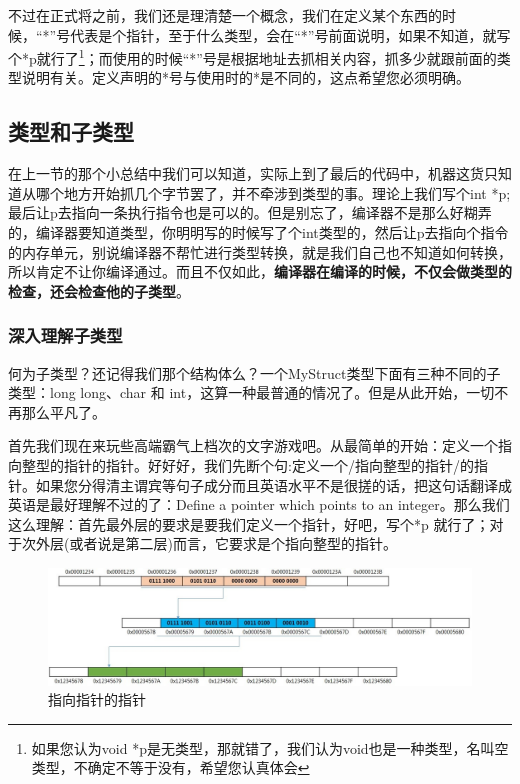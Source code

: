 \documentclass[11pt,twoside,a4paper,titlepage]{article}	%
\begin{document}
不过在正式将之前，我们还是理清楚一个概念，我们在定义某个东西的时候，“*”号代表是个指针，至于什么类型，会在“*”号前面说明，如果不知道，就写个*p就行了\footnote{如果您认为void *p是无类型，那就错了，我们认为void也是一种类型，名叫空类型，不确定不等于没有，希望您认真体会}；而使用的时候“*”号是根据地址去抓相关内容，抓多少就跟前面的类型说明有关。定义声明的*号与使用时的*是不同的，这点希望您必须明确。

\subsection{类型和子类型}
在上一节的那个小总结中我们可以知道，实际上到了最后的代码中，机器这货只知道从哪个地方开始抓几个字节罢了，并不牵涉到类型的事。理论上我们写个int *p;最后让p去指向一条执行指令也是可以的。但是别忘了，编译器不是那么好糊弄的，编译器要知道类型，你明明写的时候写了个int类型的，然后让p去指向个指令的内存单元，别说编译器不帮忙进行类型转换，就是我们自己也不知道如何转换，所以肯定不让你编译通过。而且不仅如此，\textbf{编译器在编译的时候，不仅会做类型的检查，还会检查他的子类型}。

\subsubsection{深入理解子类型}
何为子类型？还记得我们那个结构体么？一个MyStruct类型下面有三种不同的子类型：long long、char 和 int，这算一种最普通的情况了。但是从此开始，一切不再那么平凡了。

首先我们现在来玩些高端霸气上档次的文字游戏吧。从最简单的开始：定义一个指向整型的指针的指针。好好好，我们先断个句:定义一个/指向整型的指针/的指针。如果您分得清主谓宾等句子成分而且英语水平不是很搓的话，把这句话翻译成英语是最好理解不过的了：Define a pointer which points to an integer。那么我们这么理解：首先最外层的要求是要我们\textcolor[rgb]{0.5,.0,.0}{定义一个指针}，好吧，写个*p 就行了；对于次外层(或者说是第二层)而言，它要求是个\textcolor[rgb]{0.5,.0,.0}{指向整型的指针}。

\begin{figure}[H]
\centering
\includegraphics[scale=.5]{../src/sedpointer.jpg}
\caption{指向指针的指针}
\label{fig:sedpointer}
\end{figure}
\end{document}
